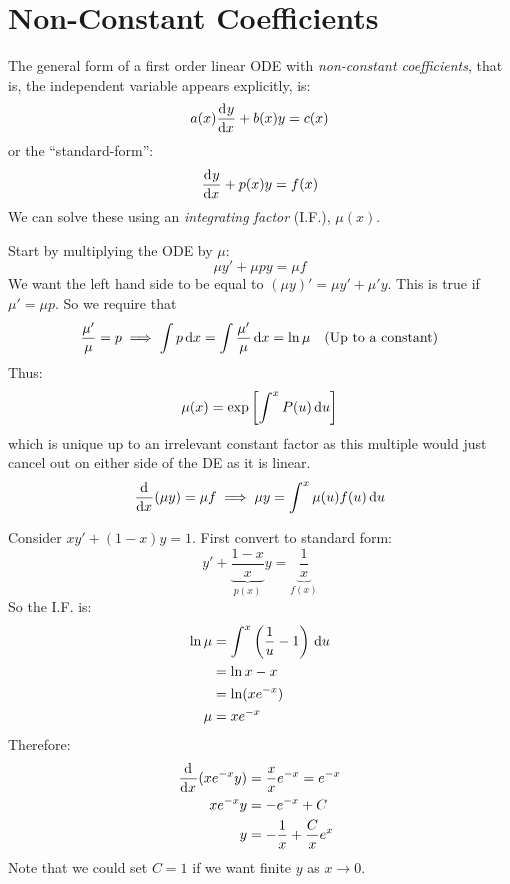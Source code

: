 \documentclass[../main.tex]{subfiles}
\begin{document}
\section{Non-Constant Coefficients}
The general form of a first order linear ODE with \textit{non-constant coefficients}, that is, the independent variable appears explicitly, is:
\[
  a(x)\deriv{y}{x} + b(x)y = c(x)
\]
or the ``standard-form'':
\[
  \deriv{y}{x} + p(x)y = f(x)
\]
We can solve these using an \textit{integrating factor} (I.F.), $\mu(x)$.

Start by multiplying the ODE by $\mu$:
\[
  \mu y' + \mu py = \mu f
\]
We want the left hand side to be equal to $(\mu y)' = \mu y' + \mu' y$.
This is true if $\mu' = \mu p$.
So we require that
\[
  \frac{\mu'}{\mu} = p \implies \int p \,\mathrm{d} x = \int \frac{\mu'}{\mu} \,\mathrm{d} x = \ln \mu \quad\text{(Up to a constant)}
\]
Thus:
\[
  \mu(x) = \exp\left[\int^x P(u) \,\mathrm{d} u\right]
\]
which is unique up to an irrelevant constant factor as this multiple would just cancel out on either side of the DE as it is linear.
\[
  \deriv{}{x}(\mu y) = \mu f \implies \mu y = \int^x \mu(u)f(u) \d{u}
\]
\begin{example}
  Consider $xy' + (1-x)y = 1$.
  First convert to standard form:
  \[
    y' + \underbrace{\frac{1-x}{x}}_{p(x)}y = \underbrace{\frac{1}{x}}_{f(x)}
  \]
  So the I.F. is:
  \begin{align*}
    \ln \mu &= \int_{}^{x} \left(\frac{1}{u} - 1\right) \,\mathrm{d} u \\
            &= \ln x - x \\
            &= \ln(xe^{-x}) \\
    \mu &= xe^{-x}
  \end{align*}
  Therefore:
  \begin{align*}
    \deriv{}{x}(xe^{-x}y) &= \frac{x}{x}e^{-x} = e^{-x}\\
    xe^{-x}y &=-e^{-x} + C \\
    y &= -\frac{1}{x} + \frac{C}{x}e^{x}
  \end{align*}
  Note that we could set $C=1$ if we want finite $y$ as $x \to 0$.
\end{example}
\end{document}
